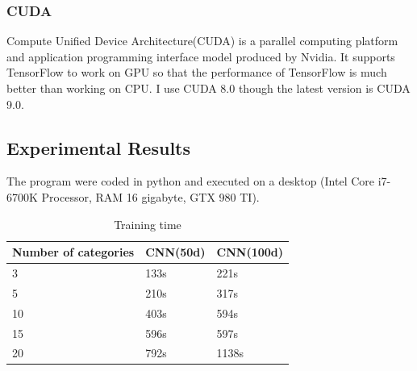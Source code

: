 \documentclass[12pt]{spieman}
\begin{document}
\begin{spacing}{1.5}
        \subsubsection{CUDA}
        Compute Unified Device Architecture(CUDA) is a parallel computing platform and application programming interface model produced by Nvidia. It supports TensorFlow to work on GPU so that the performance of TensorFlow is much better than working on CPU. I use CUDA 8.0 though the latest version is CUDA 9.0.
    \subsection{Experimental Results}
    The program were coded in python and executed on a desktop (Intel Core i7-6700K Processor, RAM 16 gigabyte, GTX 980 TI).

    \begin{table}
    \caption{Training time}
    \begin{center}
    \begin{tabular}{|l|l|l|}
    \hline
    \rule[-1ex]{0pt}{3.5ex}  Number of categories &CNN(50d)&CNN(100d)  \\
    \hline\hline
    \rule[-1ex]{0pt}{3.5ex}  3 &133s & 221s\\
    \hline
    \rule[-1ex]{0pt}{3.5ex}  5 &210s & 317s\\
    \hline
    \rule[-1ex]{0pt}{3.5ex}  10 &403s & 594s\\
    \hline
    \rule[-1ex]{0pt}{3.5ex}  15 &596s & 597s\\
    \hline
    \rule[-1ex]{0pt}{3.5ex}  20 &792s & 1138s\\
    \hline
    \end{tabular}
    \end{center}
    \end{table}


\end{spacing}
\end{document}
